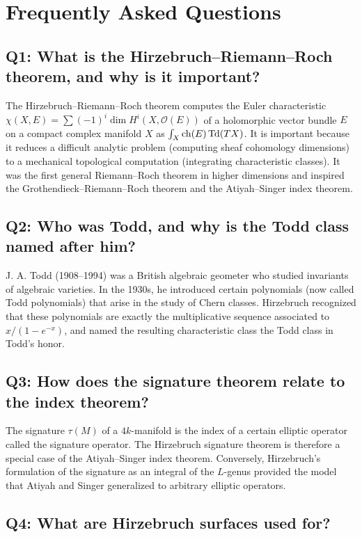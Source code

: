 \section{Frequently Asked Questions}

\subsection*{Q1: What is the Hirzebruch--Riemann--Roch theorem, and why is it important?}

The Hirzebruch--Riemann--Roch theorem computes the Euler characteristic
\(\chi(X, E) = \sum (-1)^i \dim H^i(X, \mathcal{O}(E))\) of a
holomorphic vector bundle \(E\) on a compact complex manifold \(X\) as
\(\int_X \operatorname{ch}(E) \operatorname{Td}(TX)\). It is important because it reduces a
difficult analytic problem (computing sheaf cohomology dimensions) to a
mechanical topological computation (integrating characteristic
classes). It was the first general Riemann--Roch theorem in higher
dimensions and inspired the Grothendieck--Riemann--Roch theorem and the
Atiyah--Singer index theorem.

\subsection*{Q2: Who was Todd, and why is the Todd class named after him?}

J. A. Todd (1908--1994) was a British algebraic geometer who studied
invariants of algebraic varieties. In the 1930s, he introduced certain
polynomials (now called Todd polynomials) that arise in the study of
Chern classes. Hirzebruch recognized that these polynomials are exactly
the multiplicative sequence associated to \(x/(1-e^{-x})\), and named
the resulting characteristic class the Todd class in Todd's honor.

\subsection*{Q3: How does the signature theorem relate to the index theorem?}

The signature \(\tau(M)\) of a \(4k\)-manifold is the index of a
certain elliptic operator called the signature operator. The Hirzebruch
signature theorem is therefore a special case of the Atiyah--Singer
index theorem. Conversely, Hirzebruch's formulation of the signature as
an integral of the \(L\)-genus provided the model that Atiyah and
Singer generalized to arbitrary elliptic operators.

\subsection*{Q4: What are Hirzebruch surfaces used for?}

